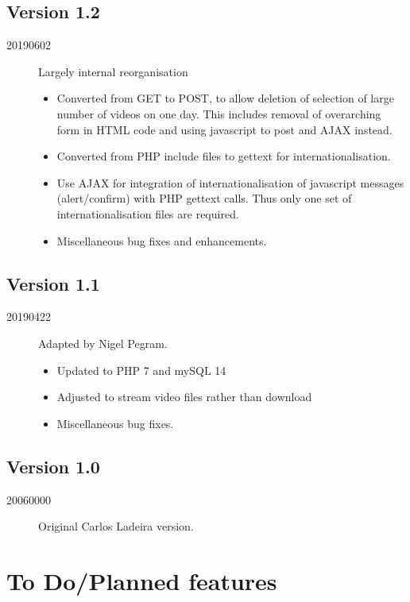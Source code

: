\documentclass[12pt]{scrartcl} %
\begin{document}
	\subsection{Version 1.2}
		\begin{description}
			\item [20190602] Largely internal reorganisation
			\begin{itemize}
				\item Converted from GET to POST, to allow deletion of
						selection of large number of videos on one day.
						This includes removal of overarching form in HTML
						code and using javascript to post and AJAX instead.
				\item Converted from PHP include files to gettext for
						internationalisation.
				\item Use AJAX for integration of internationalisation
						of javascript messages (alert/confirm) with PHP gettext calls.
						Thus only one set of internationalisation files are required.
				\item Miscellaneous bug fixes and enhancements.
			\end{itemize}
		\end{description}

	\subsection{Version 1.1}
		\begin{description}
			\item [20190422] 	Adapted by Nigel Pegram.
			\begin{itemize}
				\item	Updated to PHP 7 and mySQL 14
				\item	Adjusted to stream video files rather than download
				\item	Miscellaneous bug fixes.
			\end{itemize}
		\end{description}

	\subsection{Version 1.0}
		\begin{description}
			\item [20060000] 	Original Carlos Ladeira version.
		\end{description}



\section{To Do/Planned features}
\end{document}
